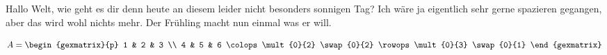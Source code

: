 \documentclass{article}
\begin{document}
Hallo Welt, wie geht es dir denn heute an diesem leider nicht besonders sonnigen Tag? Ich wäre ja eigentlich sehr gerne spazieren gegangen, aber das wird wohl nichts mehr. Der Frühling macht nun einmal was er will. 

\begin{equation*}
    A = \begin{gexmatrix}{p}
        1 & 2 & 3 \\ 
        4 & 5 & 6
        \colops
        \mult{0}{2}
        \swap{0}{2}
        \rowops
        \mult{0}{3}
        \swap{0}{1}
    \end{gexmatrix}
\end{equation*}
\end{document}
